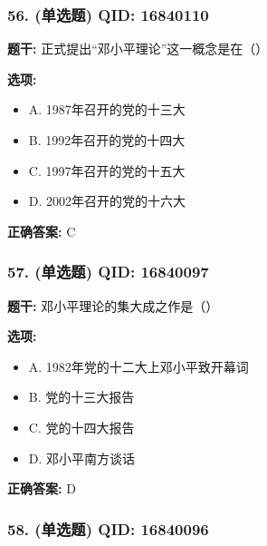 \documentclass[12pt,UTF8]{ctexart}
\begin{document}
\subsubsection*{56. (单选题) \small QID: 16840110}

\textbf{题干:}
正式提出“邓小平理论”这一概念是在（）

\textbf{选项:}
\begin{itemize}[leftmargin=*]

  \item A. 1987年召开的党的十三大

  \item B. 1992年召开的党的十四大

  \item C. 1997年召开的党的十五大

  \item D. 2002年召开的党的十六大

\end{itemize}

\textbf{正确答案:}
C

\vspace{0.3em}\hrulefill\vspace{0.7em}

\subsubsection*{57. (单选题) \small QID: 16840097}

\textbf{题干:}
邓小平理论的集大成之作是（）

\textbf{选项:}
\begin{itemize}[leftmargin=*]

  \item A. 1982年党的十二大上邓小平致开幕词

  \item B. 党的十三大报告

  \item C. 党的十四大报告

  \item D. 邓小平南方谈话

\end{itemize}

\textbf{正确答案:}
D

\vspace{0.3em}\hrulefill\vspace{0.7em}

\subsubsection*{58. (单选题) \small QID: 16840096}
\end{document}
